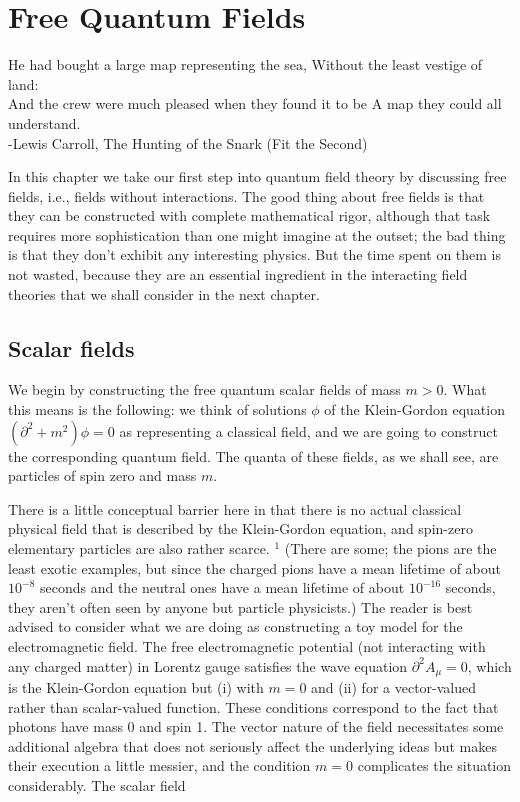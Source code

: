 \documentclass[10pt, letterpaper]{article}
\begin{document}
\section*{Free Quantum Fields}
\begin{displayquote}
He had bought a large map representing the sea, Without the least vestige of land:\\
And the crew were much pleased when they found it to be A map they could all understand.\\
-Lewis Carroll, The Hunting of the Snark (Fit the Second)
\end{displayquote}

In this chapter we take our first step into quantum field theory by discussing free fields, i.e., fields without interactions. The good thing about free fields is that they can be constructed with complete mathematical rigor, although that task requires more sophistication than one might imagine at the outset; the bad thing is that they don't exhibit any interesting physics. But the time spent on them is not wasted, because they are an essential ingredient in the interacting field theories that we shall consider in the next chapter.

\subsection*{Scalar fields}
We begin by constructing the free quantum scalar fields of mass $m>0$. What this means is the following: we think of solutions $\phi$ of the Klein-Gordon equation $\left(\partial^{2}+m^{2}\right) \phi=0$ as representing a classical field, and we are going to construct the corresponding quantum field. The quanta of these fields, as we shall see, are particles of spin zero and mass $m$.

There is a little conceptual barrier here in that there is no actual classical physical field that is described by the Klein-Gordon equation, and spin-zero elementary particles are also rather scarce. ${ }^{1}$ (There are some; the pions are the least exotic examples, but since the charged pions have a mean lifetime of about $10^{-8}$ seconds and the neutral ones have a mean lifetime of about $10^{-16}$ seconds, they aren't often seen by anyone but particle physicists.) The reader is best advised to consider what we are doing as constructing a toy model for the electromagnetic field. The free electromagnetic potential (not interacting with any charged matter) in Lorentz gauge satisfies the wave equation $\partial^{2} A_{\mu}=0$, which is the Klein-Gordon equation but (i) with $m=0$ and (ii) for a vector-valued rather than scalar-valued function. These conditions correspond to the fact that photons have mass 0 and spin 1. The vector nature of the field necessitates some additional algebra that does not seriously affect the underlying ideas but makes their execution a little messier, and the condition $m=0$ complicates the situation considerably. The scalar field
\end{document}
